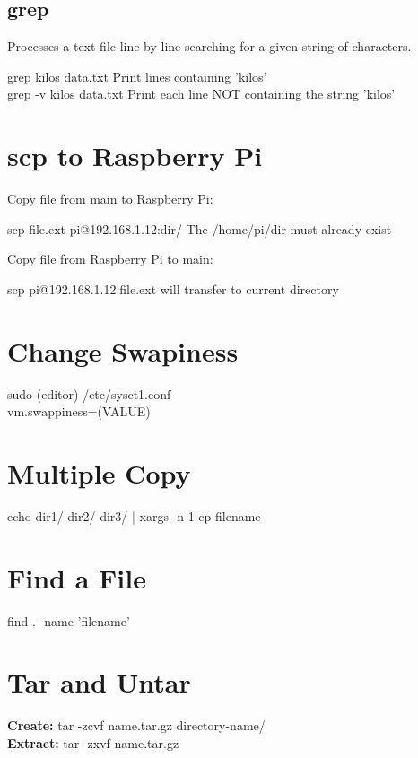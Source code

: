\documentclass[10pt]{article}
\newcommand{\bt}{\begin{tcolorbox}}
\newcommand{\et}{\end{tcolorbox}}
\begin{document}
   \subsection{grep}
   Processes a text file line by line searching for a given string of characters.
   \bt
   grep kilos data.txt \qquad Print lines containing 'kilos'\\
   grep -v kilos data.txt \quad Print each line NOT containing the string 'kilos'
   \et
  
\section{scp to Raspberry Pi}
Copy file from main to Raspberry Pi:
   \bt
   scp file.ext pi@192.168.1.12:dir/ \quad The /home/pi/dir must already exist
   \et

Copy file from Raspberry Pi to main:
   \bt
   scp pi@192.168.1.12:file.ext \quad will transfer to current directory
   \et

\section{Change Swapiness}
   \bt
   sudo (editor) /etc/sysct1.conf\\
   vm.swappiness=(VALUE)
   \et
\section{Multiple Copy}
	\bt
	echo dir1/ dir2/ dir3/ | xargs -n 1 cp filename
	\et

\section{Find a File}	
	\bt
	find . -name 'filename'
	\et
	
\section{Tar and Untar}
	\bt 
	\textbf{Create:  } tar -zcvf name.tar.gz directory-name/ \\
	\textbf{Extract: } tar -zxvf name.tar.gz
	\et
 
\end{document}
